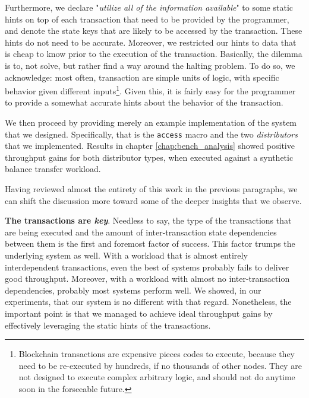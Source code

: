Furthermore, we declare "\textit{utilize all of the information available}" to some static hints on
top of each transaction that need to be provided by the programmer, and denote the state keys that
are likely to be accessed by the transaction. These hints do not need to be accurate. Moreover, we
restricted our hints to data that is cheap to know prior to the execution of the transaction.
Basically, the dilemma is to, not solve, but rather find a way around the halting
problem\cite{burkholderHaltingProblem1987}. To do so, we acknowledge: most often, transaction are
simple units of logic, with specific behavior given different inputs\footnote{Blockchain
transactions are expensive pieces codes to execute, because they need to be re-executed by hundreds,
if no thousands of other nodes. They are not designed to execute complex arbitrary logic, and should
not do anytime soon in the forseeable future.}. Given this, it is fairly easy for the programmer to
provide a somewhat accurate hints about the behavior of the transaction.

We then proceed by providing merely an example implementation of the system that we designed.
Specifically, that is the \texttt{access} macro and the two \textit{distributors} that we
implemented. Results in chapter \ref{chap:bench_analysis} showed positive throughput gains for both
distributor types, when executed against a synthetic balance transfer workload.


Having reviewed almost the entirety of this work in the previous paragraphs, we can shift the
discussion more toward some of the deeper insights that we observe.

\textbf{The transactions are \textit{key}}. Needless to say, the type of the transactions that are
being executed and the amount of inter-transaction state dependencies between them is the first and
foremost factor of success. This factor trumps the underlying system as well. With a workload that
is almost entirely interdependent transactions, even the best of systems probably fails to deliver
good throughput. Moreover, with a workload with almost no inter-transaction dependencies, probably
most systems perform well. We showed, in our experiments, that our system is no different with that
regard. Nonetheless, the important point is that we managed to achieve ideal throughput gains by
effectively leveraging the static hints of the transactions.

